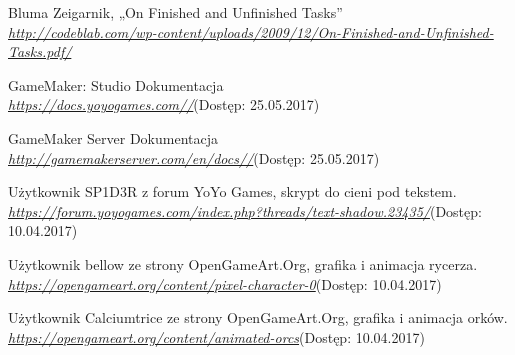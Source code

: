 \documentclass[openright]{xmgr}
\begin{document}





\begin{thebibliography}{9}

Bluma Zeigarnik, „On Finished and Unfinished Tasks”\\
\textit{\url{http://codeblab.com/wp-content/uploads/2009/12/On-Finished-and-Unfinished-Tasks.pdf/}}

GameMaker: Studio Dokumentacja\\
\textit{\url{https://docs.yoyogames.com//}}(Dostęp: 25.05.2017)

GameMaker Server Dokumentacja\\
\textit{\url{http://gamemakerserver.com/en/docs//}}(Dostęp: 25.05.2017)

Użytkownik SP1D3R z forum YoYo Games, skrypt do cieni pod tekstem.\\
\textit{\url{https://forum.yoyogames.com/index.php?threads/text-shadow.23435/}}(Dostęp: 10.04.2017)

Użytkownik bellow ze strony OpenGameArt.Org, grafika i animacja rycerza.\\
\textit{\url{https://opengameart.org/content/pixel-character-0}}(Dostęp: 10.04.2017)

Użytkownik Calciumtrice ze strony OpenGameArt.Org, grafika i animacja orków.\\
\textit{\url{https://opengameart.org/content/animated-orcs}}(Dostęp: 10.04.2017)

\end{thebibliography}

\listoffigures

\oswiadczenie
\end{document}

